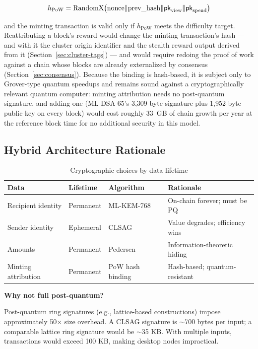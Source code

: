 \begin{equation}
h_{\text{PoW}} = \text{RandomX}\bigl(\text{nonce} \| \text{prev\_hash}
\| \mathsf{pk}_{\text{view}} \| \mathsf{pk}_{\text{spend}}\bigr)
\end{equation}

and the minting transaction is valid only if $h_{\text{PoW}}$ meets the
difficulty target. Reattributing a block's reward would change the
minting transaction's hash --- and with it the cluster origin identifier
and the stealth reward output derived from it
(Section~\ref{sec:cluster-tags}) --- and would require redoing the proof
of work against a chain whose blocks are already externalized by
consensus (Section~\ref{sec:consensus}). Because the binding is
hash-based, it is subject only to Grover-type quantum speedups and
remains sound against a cryptographically relevant quantum computer:
minting attribution needs no post-quantum signature, and adding one
(ML-DSA-65's 3{,}309-byte signature plus 1{,}952-byte public key on
every block) would cost roughly 33~GB of chain growth per year at the
reference block time for no additional security in this model.

\subsection{Hybrid Architecture Rationale}
\label{sec:hybrid-rationale}

\begin{table}[h]
\centering
\caption{Cryptographic choices by data lifetime}
\label{tab:hybrid}
\begin{tabular}{@{}llll@{}}
\toprule
\textbf{Data} & \textbf{Lifetime} & \textbf{Algorithm} & \textbf{Rationale} \\
\midrule
Recipient identity & Permanent & ML-KEM-768 & On-chain forever; must be PQ \\
Sender identity & Ephemeral & CLSAG & Value degrades; efficiency wins \\
Amounts & Permanent & Pedersen & Information-theoretic hiding \\
Minting attribution & Permanent & PoW hash binding & Hash-based; quantum-resistant \\
\bottomrule
\end{tabular}
\end{table}

\textbf{Why not full post-quantum?}

Post-quantum ring signatures (e.g., lattice-based constructions) impose
approximately 50$\times$ size overhead. A CLSAG signature is $\sim$700
bytes per input; a comparable lattice ring signature would be
$\sim$35 KB. With multiple inputs, transactions would exceed 100 KB,
making desktop nodes impractical.

